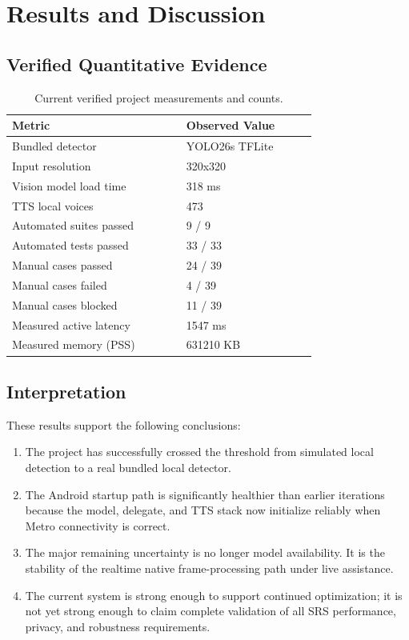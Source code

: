 \documentclass[conference]{IEEEtran}
\begin{document}
\section{Results and Discussion}
\subsection{Verified Quantitative Evidence}
\begin{table}[!t]
\centering
\begin{tabular}{p{0.44\linewidth} p{0.33\linewidth}}
\toprule
Metric & Observed Value \\
\midrule
Bundled detector & YOLO26s TFLite \\
Input resolution & 320x320 \\
Vision model load time & 318 ms \\
TTS local voices & 473 \\
Automated suites passed & 9 / 9 \\
Automated tests passed & 33 / 33 \\
Manual cases passed & 24 / 39 \\
Manual cases failed & 4 / 39 \\
Manual cases blocked & 11 / 39 \\
Measured active latency & 1547 ms \\
Measured memory (PSS) & 631210 KB \\
\bottomrule
\end{tabular}
\caption{Current verified project measurements and counts.}
\label{tab:metrics}
\end{table}

\subsection{Interpretation}
These results support the following conclusions:
\begin{enumerate}[leftmargin=1.2em]
\item The project has successfully crossed the threshold from simulated local detection to a real bundled local detector.
\item The Android startup path is significantly healthier than earlier iterations because the model, delegate, and TTS stack now initialize reliably when Metro connectivity is correct.
\item The major remaining uncertainty is no longer model availability. It is the stability of the realtime native frame-processing path under live assistance.
\item The current system is strong enough to support continued optimization; it is not yet strong enough to claim complete validation of all SRS performance, privacy, and robustness requirements.
\end{enumerate}
\end{document}

